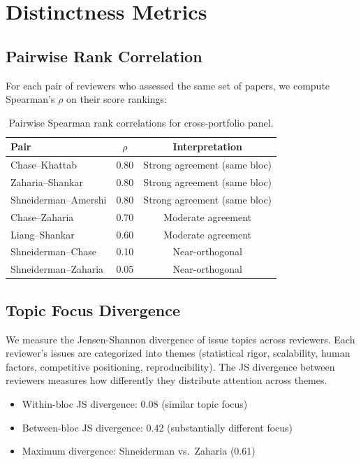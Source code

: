 \section{Distinctness Metrics}

\subsection{Pairwise Rank Correlation}

For each pair of reviewers who assessed the same set of papers, we compute Spearman's $\rho$ on their score rankings:

\begin{table}[h]
\centering
\small
\begin{tabular}{lcc}
\toprule
Pair & $\rho$ & Interpretation \\
\midrule
Chase--Khattab & 0.80 & Strong agreement (same bloc) \\
Zaharia--Shankar & 0.80 & Strong agreement (same bloc) \\
Shneiderman--Amershi & 0.80 & Strong agreement (same bloc) \\
Chase--Zaharia & 0.70 & Moderate agreement \\
Liang--Shankar & 0.60 & Moderate agreement \\
Shneiderman--Chase & 0.10 & Near-orthogonal \\
Shneiderman--Zaharia & 0.05 & Near-orthogonal \\
\bottomrule
\end{tabular}
\caption{Pairwise Spearman rank correlations for cross-portfolio panel.}
\end{table}

\subsection{Topic Focus Divergence}

We measure the Jensen-Shannon divergence of issue topics across reviewers. Each reviewer's issues are categorized into themes (statistical rigor, scalability, human factors, competitive positioning, reproducibility). The JS divergence between reviewers measures how differently they distribute attention across themes.

\begin{itemize}
    \item Within-bloc JS divergence: 0.08 (similar topic focus)
    \item Between-bloc JS divergence: 0.42 (substantially different focus)
    \item Maximum divergence: Shneiderman vs.\ Zaharia (0.61)
\end{itemize}


